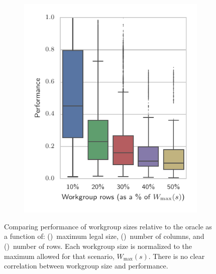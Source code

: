 \documentclass[nonatbib,preprint,nocopyrightspace,9pt]{sigplanconf}
\begin{document}
\begin{figure}
\begin{subfigure}[h]{.48\columnwidth}
    \includegraphics[width=\columnwidth]{img/performance_max_r}
    \vspace{-1.5em} %
    \caption{}
    \label{fig:performance-wg-r}
  \end{subfigure}
  \caption{%
    Comparing performance of workgroup sizes relative to the oracle as
    a function of: ()~maximum legal
    size, ()~number of columns, and
    ()~number of rows. Each workgroup
    size is normalized to the maximum allowed for that scenario,
    $W_{\max}(s)$. There is no clear correlation between workgroup
    size and performance.%
    \vspace{-1em}
  }
  \label{fig:performance-wgsizes}
\end{figure}
\end{document}
